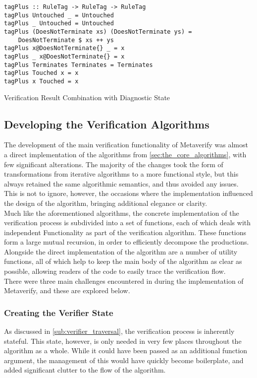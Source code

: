 \begin{listing}[!htb]
\begin{verbatim}
tagPlus :: RuleTag -> RuleTag -> RuleTag
tagPlus Untouched _ = Untouched
tagPlus _ Untouched = Untouched
tagPlus (DoesNotTerminate xs) (DoesNotTerminate ys) =
    DoesNotTerminate $ xs ++ ys
tagPlus x@DoesNotTerminate{} _ = x
tagPlus _ x@DoesNotTerminate{} = x
tagPlus Terminates Terminates = Terminates
tagPlus Touched x = x
tagPlus x Touched = x
\end{verbatim}
\caption{Verification Result Combination with Diagnostic State}
\label{lst:verification_result_combination_with_diagnostic_state}
\end{listing}


\subsection{Developing the Verification Algorithms} %
\label{sub:developing_the_verification_algorithms}
The development of the main verification functionality of Metaverify was almost a direct implementation of the algorithms from \autoref{sec:the_core_algorithms}, with few significant alterations.
The majority of the changes took the form of transformations from iterative algorithms to a more functional style, but this always retained the same algorithmic semantics, and thus avoided any issues. 
This is not to ignore, however, the occasions where the implementation influenced the design of the algorithm, bringing additional elegance or clarity.\\

Much like the aforementioned algorithms, the concrete implementation of the verification process is subdivided into a set of functions, each of which deals with independent Functionality as part of the verification algorithm.
These functions form a large mutual recursion, in order to efficiently decompose the productions. 
Alongside the direct implementation of the algorithm are a number of utility functions, all of which help to keep the main body of the algorithm as clear as possible, allowing readers of the code to easily trace the verification flow. \\

There were three main challenges encountered in during the implementation of Metaverify, and these are explored below.

\subsubsection{Creating the Verifier State} %
\label{ssub:creating_the_verifier_state}
As discussed in \autoref{sub:verifier_traversal}, the verification process is inherently stateful.
This state, however, is only needed in very few places throughout the algorithm as a whole. 
While it could have been passed as an additional function argument, the management of this would have quickly become boilerplate, and added significant clutter to the flow of the algorithm. \\

